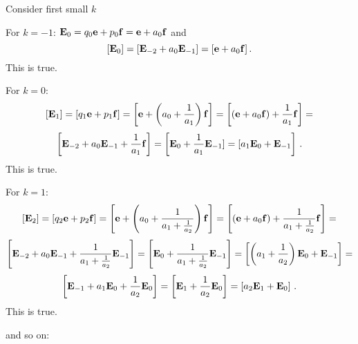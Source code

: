 Consider first small $k$

For $k=-1$:
${\bf E}_0=q_0{\bf e}+p_0{\bf f}={\bf e}+a_0{\bf f}$ and
         $$
[{\bf E}_0]=[{\bf E}_{-2}+a_0{\bf E}_{-1}]=[{\bf e}+a_0{\bf f}]\,.
         $$
This is true.




For $k=0$:
       $$
[{\bf E}_1]=[q_1{\bf e}+p_1{\bf f}]=
\left[{\bf e}+\left(a_0+{1\over a_1}\right){\bf f}\right]=
\left[\left({\bf e}+a_0{\bf f}\right)+{1\over a_1}{\bf f}\right]=
        $$
        $$
\left[{\bf E}_{-2}+a_0{\bf E}_{-1}+{1\over a_1}{\bf f}\right]=
\left[{\bf E}_0+{1\over a_1}{\bf E}_{-1}]=[a_1{\bf E}_0+{\bf E}_{-1}\right]\,.
         $$
This is true.

\medskip

For $k=1$:
       $$
[{\bf E}_2]=[q_2{\bf e}+p_2{\bf f}]=
\left[{\bf e}+\left(a_0+{1\over a_1+{1\over a_2}}\right){\bf f}\right]=
\left[\left({\bf e}+a_0{\bf f}\right)+{1\over a_1+{1\over a_2}}{\bf f}\right]=
        $$
        $$
\left[{\bf E}_{-2}+a_0{\bf E}_{-1}+
{1\over a_1+{1\over a_2}}{\bf E}_{-1}\right]=
\left[{\bf E}_0+{1\over a_1+{1\over a_2}}{\bf E}_{-1}\right]=
\left[\left(a_1+{1\over a_2}\right){\bf E}_0+{\bf E}_{-1}\right]=
         $$
         $$
\left[{\bf E}_{-1}+a_1{\bf E}_0+{1\over a_2}{\bf E}_0\right]=
\left[{\bf E}_1+{1\over a_2}{\bf E}_0\right]=
\left[a_2{\bf E}_1+{\bf E}_0\right]\,.
         $$
This is true.

and so on:



